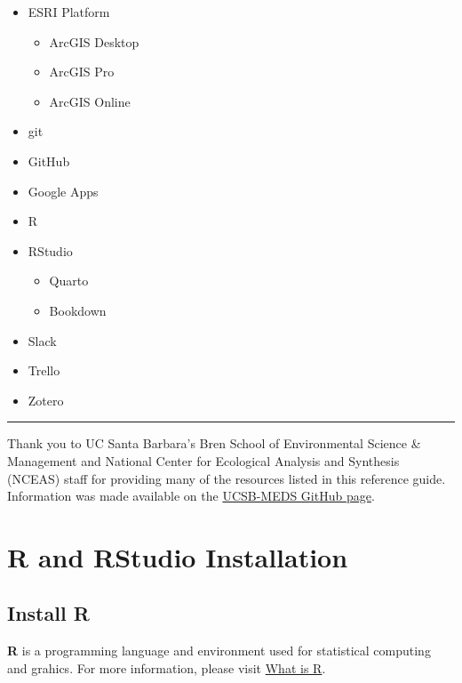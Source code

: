 \documentclass[
]{book}
\providecommand{\tightlist}{%
  \setlength{\itemsep}{0pt}\setlength{\parskip}{0pt}}
\begin{document}
\begin{itemize}
\tightlist
\item
  ESRI Platform

  \begin{itemize}
  \tightlist
  \item
    ArcGIS Desktop
  \item
    ArcGIS Pro
  \item
    ArcGIS Online
  \end{itemize}
\item
  git
\item
  GitHub
\item
  Google Apps
\item
  R
\item
  RStudio

  \begin{itemize}
  \tightlist
  \item
    Quarto
  \item
    Bookdown
  \end{itemize}
\item
  Slack
\item
  Trello
\item
  Zotero
\end{itemize}

\begin{center}\rule{0.5\linewidth}{0.5pt}\end{center}

Thank you to UC Santa Barbara's Bren School of Environmental Science \& Management and National Center for Ecological Analysis and Synthesis (NCEAS) staff for providing many of the resources listed in this reference guide. Information was made available on the \href{https://github.com/UCSB-MEDS}{UCSB-MEDS GitHub page}.

\hypertarget{r}{%
\chapter{R and RStudio Installation}\label{r}}

\hypertarget{install-r}{%
\section{Install R}\label{install-r}}

\textbf{R} is a programming language and environment used for statistical computing and grahics. For more information, please visit \href{https://www.r-project.org/about.html}{What is R}.
\end{document}
